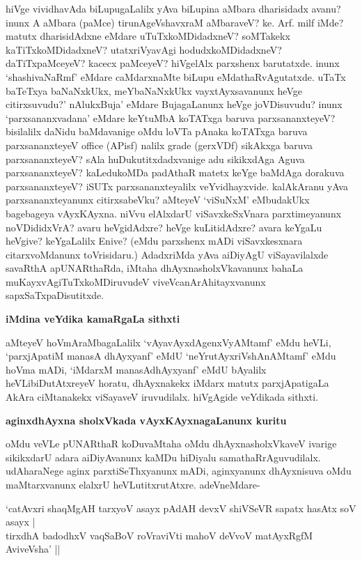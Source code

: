 hiVge vividhavAda biLupugaLalilx yAva biLupina aMbara dharisidadx avanu? inunx A aMbara (paMce) tirunAgeVshavxraM aMbaraveV? ke. Arf. milf iMde? matutx dharisidAdxne eMdare uTuTxkoMDidadxneV? soMTakekx kaTiTxkoMDidadxneV? utatxriVyavAgi hodudxkoMDidadxneV? daTiTxpaMceyeV? kacecx paMceyeV? hiVgelAlx parxshenx barutatxde. inunx `shashivaNaRmf' eMdare caMdarxnaMte biLupu eMdathaRvAgutatxde. uTaTx baTeTxya baNaNxkUkx, meYbaNaNxkUkx vayxtAyxsavanunx heVge citirxsuvudu?' nAlukxBuja' eMdare BujagaLanunx heVge joVDisuvudu? inunx `parxsananxvadana' eMdare keYtuMbA koTATxga baruva parxsananxteyeV? bisilalilx daNidu baMdavanige oMdu loVTa pAnaka koTATxga baruva parxsananxteyeV {\rm office} (APisf) nalilx {\rm grade} (gerxVDf) sikAkxga baruva parxsananxteyeV? sAla huDukutitxdadxvanige adu sikikxdAga Aguva parxsananxteyeV? kaLedukoMDa padAthaR matetx keYge baMdAga dorakuva parxsananxteyeV? iSUTx parxsananxteyalilx veYvidhayxvide. kalAkAranu yAva parxsananxteyanunx citirxsabeVku? aMteyeV `viSuNxM' eMbudakUkx bagebageya vAyxKAyxna. niVvu elAlxdarU viSavxkeSxVnara parxtimeyanunx noVDididxVrA? avaru heVgidAdxre? heVge kuLitidAdxre? avara keYgaLu heVgive? keYgaLalilx Enive? (eMdu parxshenx mADi viSavxkesxnara citarxvoMdanunx toVrisidaru.) AdadxriMda yAva aiDiyAgU viSayavilalxde savaRthA apUNARthaRda, iMtaha dhAyxnasholxVkavanunx bahaLa muKayxvAgiTuTxkoMDiruvudeV viveVcanArAhitayxvanunx sapxSaTxpaDisutitxde.

\noindent
{\bf\large{iMdina veYdika kamaRgaLa sithxti}}\label{pages208}

aMteyeV hoVmAraMbagaLalilx `vAyavAyxdAgenxVyAMtamf'\label{208} eMdu heVLi, `parxjApatiM manasA dhAyxyanf' eMdU `neYrutAyxriVshAnAMtamf' eMdu hoVma mADi, `iMdarxM manasAdhAyxyanf' eMdU bAyalilx heVLibiDutAtxreyeV horatu, dhAyxnakekx iMdarx matutx parxjApatigaLa AkAra ciMtanakekx viSayaveV iruvudilalx. hiVgAgide veYdikada sithxti.

\noindent
{\bf\large{aginxdhAyxna sholxVkada vAyxKAyxnagaLanunx kuritu }}\label{page208}

oMdu veVLe pUNARthaR koDuvaMtaha oMdu dhAyxnasholxVkaveV ivarige sikikxdarU adara aiDiyAvanunx kaMDu hiDiyalu samathaRrAguvudilalx. udAharaNege aginx parxtiSeThxyanunx mADi, aginxyanunx dhAyxnisuva oMdu maMtarxvanunx elalxrU heVLutitxrutAtxre. adeVneMdare-

\begin{shloka}
`catAvxri shaqMgAH tarxyoV asayx pAdAH devxV shiVSeVR sapatx hasAtx soV asayx |\\\label{208}
tirxdhA badodhxV vaqSaBoV roVraviVti mahoV deVvoV matAyxRgfM AviveVsha' ||\label{117}
\end{shloka}

